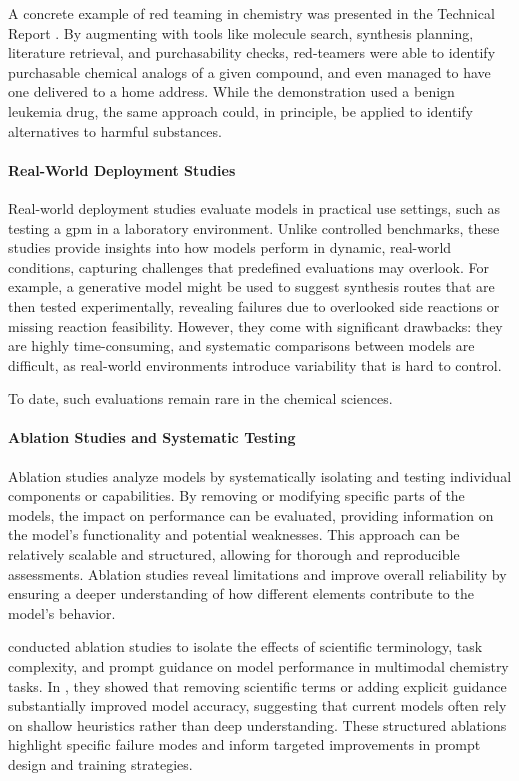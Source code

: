 A concrete example of red teaming in chemistry was presented in the  Technical Report \autocite{openai2023gpt04}. 
By augmenting  with tools like molecule search, synthesis planning, literature retrieval, and purchasability checks, red-teamers were able to identify purchasable chemical analogs of a given compound, and even managed to have one delivered to a home address. 
While the demonstration used a benign leukemia drug, the same approach could, in principle, be applied to identify alternatives to harmful substances.\autocite{urbina2022dual}

\paragraph{Real-World Deployment Studies} 
Real-world deployment studies evaluate models in practical use settings, such as testing a \gls{gpm} in a laboratory environment.
Unlike controlled benchmarks, these studies provide insights into how models perform in dynamic, real-world conditions, capturing challenges that predefined evaluations may overlook. 
For example, a generative model might be used to suggest synthesis routes that are then tested experimentally, revealing failures due to overlooked side reactions or missing reaction feasibility. However, they come with significant drawbacks: they are highly time-consuming, and systematic comparisons between models are difficult, as real-world environments introduce variability that is hard to control. 

To date, such evaluations remain rare in the chemical sciences. 


\paragraph{Ablation Studies and Systematic Testing} 
Ablation studies analyze models by systematically isolating and testing individual components or capabilities. 
By removing or modifying specific parts of the models, the impact on performance can be evaluated, providing information on the model’s functionality and potential weaknesses. This approach can be relatively scalable and structured, allowing for thorough and reproducible assessments. Ablation studies reveal limitations and improve overall reliability by ensuring a deeper understanding of how different elements contribute to the model’s behavior. 

\textcite{alampara2024probing} conducted ablation studies to isolate the effects of scientific terminology, task complexity, and prompt guidance on model performance in multimodal chemistry tasks. 
In , they showed that removing scientific terms or adding explicit guidance substantially improved model accuracy, suggesting that current models often rely on shallow heuristics rather than deep understanding. These structured ablations highlight specific failure modes and inform targeted improvements in prompt design and training strategies.

